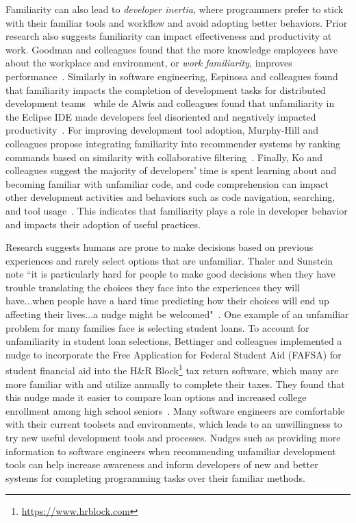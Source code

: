 Familiarity can also lead to \textit{developer inertia}, where programmers prefer to stick with their familiar tools and workflow and avoid adopting better behaviors. Prior research also suggests familiarity can impact effectiveness and productivity at work. Goodman and colleagues found that the more knowledge employees have about the workplace and environment, or \textit{work familiarity}, improves performance~\cite{goodman1992familiarity}. Similarly in software engineering, Espinosa and colleagues found that familiarity impacts the completion of development tasks for distributed development teams~\cite{espinosa2002shared} while de Alwis and colleagues found that unfamiliarity in the Eclipse IDE made developers feel disoriented and negatively impacted productivity~\cite{de2006using}. For improving development tool adoption, Murphy-Hill and colleagues propose integrating familiarity into recommender systems by ranking commands based on similarity with collaborative filtering~\cite{Murphy-Hill2012Fluency}. Finally, Ko and colleagues suggest the majority of developers' time is spent learning about and becoming familiar with unfamiliar code, and code comprehension can impact other development activities and behaviors such as code navigation, searching, and tool usage~\cite{ko2006exploratory}. This indicates that familiarity plays a role in developer behavior and impacts their adoption of useful practices.

Research suggests humans are prone to make decisions based on previous experiences and rarely select options that are unfamiliar. Thaler and Sunstein note ``it is particularly hard for people to make good decisions when they have trouble translating the choices they face into the experiences they will have...when people have a hard time predicting how their choices will end up affecting their lives...a nudge might be welcomed"~\cite[p.~77-78]{sunstein2008nudge}. One example of an unfamiliar problem for many families face is selecting student loans. To account for unfamiliarity in student loan selections, Bettinger and colleagues implemented a nudge to incorporate the Free Application for Federal Student Aid (FAFSA) for student financial aid into the H\&R Block\footnote{\url{https://www.hrblock.com}} tax return software, which many are more familiar with and utilize annually to complete their taxes. They found that this nudge made it easier to compare loan options and increased college enrollment among high school seniors~\cite{bettinger2013fafsa}. Many software engineers are comfortable with their current toolsets and environments, which leads to an unwillingness to try new useful development tools and processes. Nudges such as providing more information to software engineers when recommending unfamiliar development tools can help increase awareness and inform developers of new and better systems for completing programming tasks over their familiar methods.


